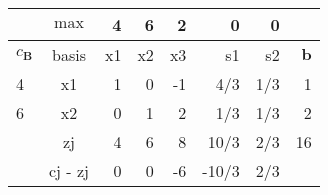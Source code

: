 \begin{frameExample}{\label{example:6.6-2.1}}{}
\begin{onlyenv}
  \begin{table}[!ht]
    \centering
    \begin{tabular}{lc|rrrrr|r}
    \toprule
      ~ &$\max$ & 4 & 6 & 2 & 0 & 0 & ~ \\
      \midrule
      $c_{\boldsymbol{B}}$ & basis & x1 & x2 & x3 & s1 & s2 & $\boldsymbol{b}$ \\
      \midrule
        4 & x1 & 1 & 0 & -1 &  4/3  &  1/3  & 1 \\ 
      6 & x2 & 0 & 1 & 2 &  1/3  &  1/3  & 2 \\
      \midrule
        ~ & zj & 4 & 6 & 8 & 10/3  &  2/3  & 16 \\ 
        ~ & cj - zj & 0 & 0 & -6 & -10/3  &  2/3 \\ 
    \end{tabular}
\end{table}
  
\end{onlyenv}
\end{frameExample}



